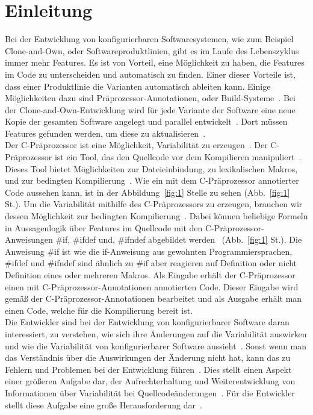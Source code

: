 \chapter{Einleitung}
%


Bei der Entwicklung von konfigurierbaren Softwaresystemen, wie zum Beispiel Clone-and-Own, oder Softwareproduktlinien, gibt es im Laufe des Lebenszyklus immer mehr Features. Es ist von Vorteil, eine Möglichkeit zu haben, die Features im Code zu unterscheiden und automatisch zu finden. Einer dieser Vorteile ist, dass einer Produktlinie die Varianten automatisch ableiten kann. Einige Möglichkeiten dazu sind Präprozessor-Annotationen, oder Build-Systeme~\cite{ABKS13}. Bei der Clone-and-Own-Entwicklung wird für jede Variante der Software eine neue Kopie der gesamten Software angelegt und parallel entwickelt~\cite{BTS+:ESECFSE22}. Dort müssen Features gefunden werden, um diese zu aktualisieren~\cite{BTS+:ESECFSE22,KTSB:ICSE21,KB:ESECFSE20,KB:VaMoS20,KKK+:SPLC18,ZSL+:ICSE18}.\\


Der C-Präprozessor ist eine Möglichkeit, Variabilität zu erzeugen~\cite{ABKS13}. Der C-Präprozessor ist ein Tool, das den Quellcode vor dem Kompilieren manipuliert~\cite{ABKS13}. Dieses Tool bietet Möglichkeiten zur Dateieinbindung, zu lexikalischen Makros, und zur bedingten Kompilierung~\cite{ABKS13}. Wie ein mit dem  C-Präprozessor annotierter Code aussehen kann, ist in der Abbildung~\ref{fig:1} Stelle  zu sehen (Abb.~\ref{fig:1} St.). Um die Variabilität mithilfe des C-Präprozessors zu erzeugen, brauchen wir dessen Möglichkeit zur bedingten Kompilierung~\cite{ABKS13}. Dabei können beliebige Formeln in Aussagenlogik über Features im Quellcode mit den C-Präprozessor-Anweisungen \#if, \#ifdef und, \#ifndef abgebildet werden~\cite{BTS+:ESECFSE22} (Abb.~\ref{fig:1} St.). Die Anweisung \#if ist wie die if-Anweisung aus gewohnten Programmiersprachen, \#ifdef und \#ifndef sind ähnlich zu \#if aber reagieren auf Definition oder nicht Definition eines oder mehreren Makros. Als Eingabe erhält der C-Präprozessor einen mit C-Präprozessor-Annotationen annotierten Code. Dieser Eingabe wird gemäß der C-Präprozessor-Annotationen bearbeitet und als Ausgabe erhält man einen Code, welche für die Kompilierung bereit ist.  \\

Die Entwickler sind bei der Entwicklung von konfigurierbarer Software daran interessiert, zu verstehen, wie sich ihre Änderungen auf die Variabilität auswirken und wie die Variabilität von konfigurierbarer Software aussieht~\cite{BTS+:ESECFSE22}. Sonst wenn man das Verständnis über die Auswirkungen der Änderung nicht hat, kann das zu Fehlern und Problemen bei der Entwicklung führen~\cite{BTS+:ESECFSE22,KATS:TOSEM12,NBA+:JSS15, NST+:SoSyM22,SBT:JSS19, SNB+:VaMoS21}. Dies stellt einen Aspekt einer größeren Aufgabe dar, der Aufrechterhaltung und Weiterentwicklung von Informationen über Variabilität bei Quellcodeänderungen~\cite{BTS+:ESECFSE22}. Für die Entwickler stellt diese Aufgabe eine große Herausforderung dar~\cite{BTS+:ESECFSE22,PCA+:VAMOS13, PTD+:EMSE16, SHA:SPLC12}.\\

